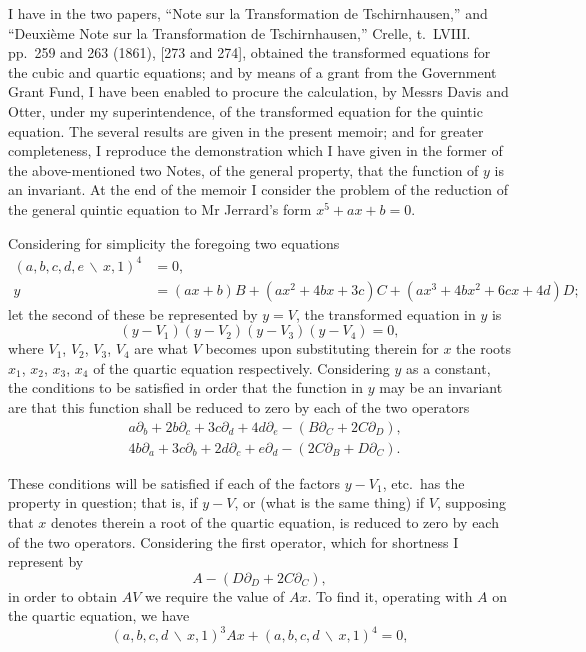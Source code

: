 \documentclass[11pt,a4paper]{book}
\begin{document}
I have in the two papers, ``Note sur la Transformation de Tschirnhausen,'' and
``Deuxi\`{e}me Note sur la Transformation de Tschirnhausen,'' Crelle, t.~LVIII. pp.~259
and 263 (1861), [273 and 274], obtained the transformed equations for the cubic and
quartic equations; and by means of a grant from the Government Grant Fund, I have been
enabled to procure the calculation, by Messrs Davis and Otter, under my superintendence,
of the transformed equation for the quintic equation. The several results are given in
the present memoir; and for greater completeness, I reproduce the demonstration which I
have given in the former of the above-mentioned two Notes, of the general property, that
the function of $y$ is an invariant. At the end of the memoir I consider the problem of
the reduction of the general quintic equation to Mr Jerrard's form $x^{5}+ax+b=0$.

Considering for simplicity the foregoing two equations
\begin{align*}
(a,b,c,d,e\,\backslash\!\!\,x,1)^{4} &= 0,\\
y &= (ax+b)B + (ax^{2}+4bx+3c)C + (ax^{3}+4bx^{2}+6cx+4d)D;
\end{align*}
let the second of these be represented by $y = V$, the transformed equation in $y$ is
\[(y-V_{1})(y-V_{2})(y-V_{3})(y-V_{4}) = 0,\]
where $V_{1}$, $V_{2}$, $V_{3}$, $V_{4}$ are what $V$ becomes upon substituting therein
for $x$ the roots $x_{1}$, $x_{2}$, $x_{3}$, $x_{4}$ of the quartic equation respectively.
Considering $y$ as a constant, the conditions to be satisfied in order that the function
in $y$ may be an invariant are that this function shall be reduced to zero by each of
the two operators
\begin{align*}
&a\partial_{b} + 2b\partial_{c} + 3c\partial_{d} + 4d\partial_{e} - (B\partial_{C} + 2C\partial_{D}),\\
&4b\partial_{a} + 3c\partial_{b} + 2d\partial_{c} + e\partial_{d} - (2C\partial_{B} + D\partial_{C}).
\end{align*}

These conditions will be satisfied if each of the factors $y-V_{1}$, etc.\ has the
property in question; that is, if $y-V$, or (what is the same thing) if $V$, supposing
that $x$ denotes therein a root of the quartic equation, is reduced to zero by each of
the two operators. Considering the first operator, which for shortness I represent by
\[A - (D\partial_{D} + 2C\partial_{C}),\]
in order to obtain $AV$ we require the value of $Ax$. To find it, operating with $A$ on
the quartic equation, we have
\[(a,b,c,d\,\backslash\!\!\,x,1)^{3}Ax + (a,b,c,d\,\backslash\!\!\,x,1)^{4} = 0,\]
\end{document}
